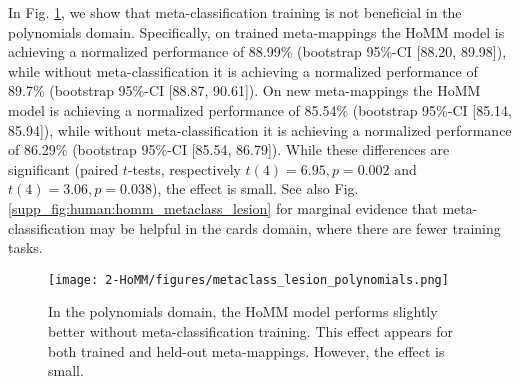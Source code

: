 In Fig. \ref{supp_fig:HoMM:metaclass_lesion}, we show that meta-classification training is not beneficial in the polynomials domain. Specifically, on trained meta-mappings the HoMM model is achieving a normalized performance of 88.99\% (bootstrap 95\%-CI [88.20, 89.98]), while without meta-classification it is achieving a normalized performance of 89.7\% (bootstrap 95\%-CI [88.87, 90.61]). On new meta-mappings the HoMM model is achieving a normalized performance of 85.54\% (bootstrap 95\%-CI [85.14, 85.94]), while without meta-classification it is achieving a normalized performance of 86.29\% (bootstrap 95\%-CI [85.54, 86.79]). While these differences are significant (paired \(t\)-tests, respectively \(t(4) = 6.95, p = 0.002\) and \(t(4) = 3.06, p = 0.038\)), the effect is small. See also Fig. \ref{supp_fig:human:homm_metaclass_lesion} for marginal evidence that meta-classification may be helpful in the cards domain, where there are fewer training tasks. 

\begin{figure}[H]
\centering
\texttt{[image: 2-HoMM/figures/metaclass\_lesion\_polynomials.png]}
\caption[In the polynomials domain, the HoMM model performs slightly better without meta-classification training.]{In the polynomials domain, the HoMM model performs slightly better without meta-classification training. This effect appears for both trained and held-out meta-mappings. However, the effect is small.}\label{supp_fig:HoMM:metaclass_lesion}
\end{figure}

